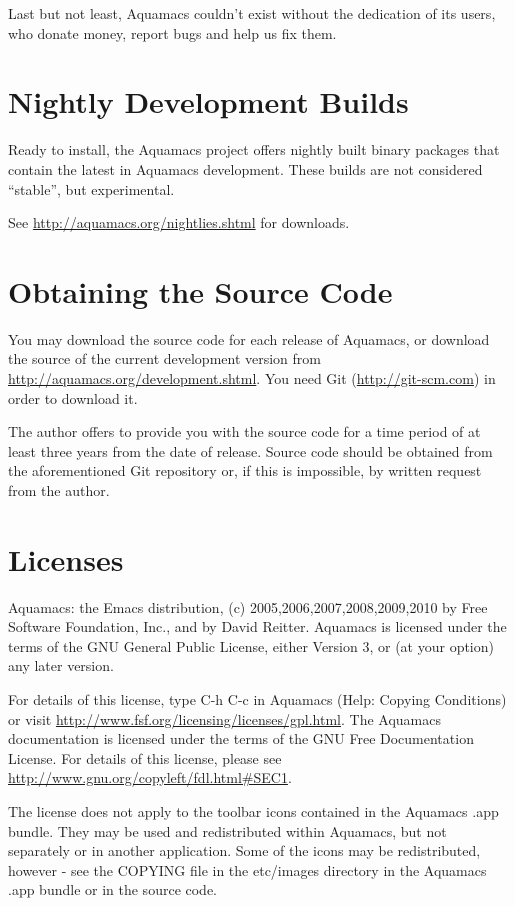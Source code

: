 \documentclass[11pt,letterpaper]{article}
\begin{document}
Last but not least, Aquamacs couldn't exist without the dedication of
its users, who donate money, report bugs and help us fix them.

\section {Nightly Development Builds}

Ready to install, the Aquamacs project offers nightly built binary
packages that contain the latest in Aquamacs development. These builds
are not considered ``stable'', but experimental.

See \url{http://aquamacs.org/nightlies.shtml} for downloads.


\section {Obtaining the Source Code}

You may download the source code for each release of Aquamacs, or
download the source of the current development version from
\url{http://aquamacs.org/development.shtml}.  You need Git (\url{http://git-scm.com}) in order to download it.

The author offers  to provide you with the source code for a time period of
at least three years from the date of release. Source code should be
obtained from the aforementioned Git repository or,
if this is impossible, by written request from the author.

\section {Licenses}

Aquamacs: the Emacs distribution, (c) 2005,2006,2007,2008,2009,2010 by Free Software
Foundation, Inc., and by David Reitter. Aquamacs is licensed under the
terms of the GNU General Public License, either Version 3, or (at your
option) any later version. 

For details of
this license, type C-h C-c in Aquamacs (Help: Copying Conditions) or
visit \url{http://www.fsf.org/licensing/licenses/gpl.html}. The
Aquamacs documentation is licensed under the terms of the GNU Free
Documentation License. For details of this license, please see
\url{http://www.gnu.org/copyleft/fdl.html#SEC1}.

The license does not apply to the toolbar icons contained in the
Aquamacs .app bundle. They may be used and redistributed within
Aquamacs, but not separately or in another application. Some of the
icons may be redistributed, however - see the COPYING file in the etc/images
directory in the Aquamacs .app bundle or in the source code.



\end{document}
